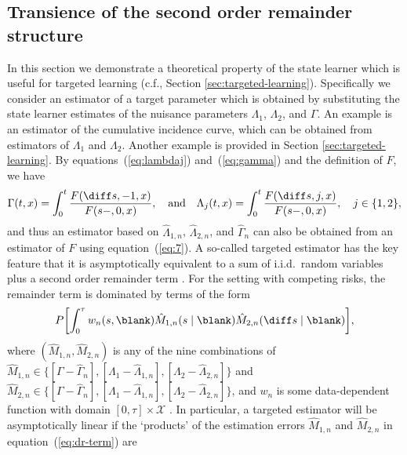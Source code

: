 \subsection{Transience of the second order remainder structure}
\label{sec:trans-second-order}

In this section we demonstrate a theoretical property of the state
learner which is useful for targeted learning (c.f., Section
\ref{sec:targeted-learning}). Specifically we consider an estimator of
a target parameter which is obtained by substituting the state learner
estimates of the nuisance parameters $\Lambda_1$, $\Lambda_2$, and
$\Gamma$. An example is an estimator of the cumulative incidence
curve, which can be obtained from estimators of $\Lambda_1$ and
$\Lambda_2$. Another example is provided in Section \ref{sec:targeted-learning}.
By equations~(\ref{eq:lambdaj}) and~(\ref{eq:gamma}) and the definition of
\( F \), we have
\begin{equation}
  \label{eq:7}
  \Gamma(t , x) 
  = \int_0^t  \frac{F(\diff s, -1, x )}{F(s-, 0, x )},
  \quad \text{and} \quad
  \Lambda_j(t , x) 
  = \int_0^t  \frac{F(\diff s, j, x )}{F(s-, 0, x )},
  \quad j \in \{1,2\},
\end{equation}
and thus an estimator based on \( \hat{\Lambda}_{1,n} \),
\( \hat{\Lambda}_{2,n} \), and \( \hat{\Gamma}_{n} \) can also be obtained from
an estimator of $F$ using equation~(\ref{eq:7}). A so-called targeted estimator
has the key feature that it is asymptotically equivalent to a sum of i.i.d.\
random variables plus a second order remainder term
\citep{van2011targeted,hines2022demystifying}. For the setting with competing
risks, the remainder term is dominated by terms of the form
\begin{equation}
  \label{eq:dr-term}
  P{\left[
      \int_0^{\tau} w_n(s, \blank)
      \hat{M}_{1,n}(s \mid  \blank)
      \hat{M}_{2,n}(\diff s \mid  \blank)
    \right]},
\end{equation}
where \( (\hat{M}_{1,n}, \hat{M}_{2,n}) \) is any of the nine combinations of
\( \hat{M}_{1,n} \in \{[\Gamma -\hat{\Gamma}_n], [\Lambda_1
-\hat{\Lambda}_{1,n}], [\Lambda_2 -\hat{\Lambda}_{2,n}]\} \) and
\( \hat{M}_{2,n} \in \{[\Gamma -\hat{\Gamma}_n], [\Lambda_1
-\hat{\Lambda}_{1,n}], [\Lambda_2 -\hat{\Lambda}_{2,n}]\} \), and \( w_n \) is
some data-dependent function with domain \([0,\tau]\times\mathcal X \)
\citep{van2003unified}. In particular, a targeted estimator will be
asymptotically linear if the `products' of the estimation errors
\( \hat{M}_{1,n} \) and \( \hat{M}_{2,n} \) in equation~(\ref{eq:dr-term}) are
